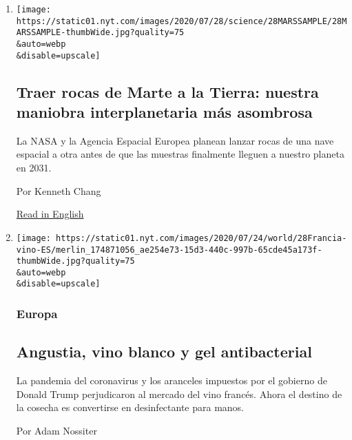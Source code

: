\begin{enumerate}
\def\labelenumi{\arabic{enumi}.}
\item
  \href{/es/2020/07/29/espanol/ciencia-y-tecnologia/mision-marte-nasa.html}{}

  \texttt{[image: https://static01.nyt.com/images/2020/07/28/science/28MARSSAMPLE/28MARSSAMPLE-thumbWide.jpg?quality=75\\\&auto=webp\\\&disable=upscale]}

  \hypertarget{traer-rocas-de-marte-a-la-tierra-nuestra-maniobra-interplanetaria-muxe1s-asombrosa}{%
  \subsection{Traer rocas de Marte a la Tierra: nuestra maniobra
  interplanetaria más
  asombrosa}\label{traer-rocas-de-marte-a-la-tierra-nuestra-maniobra-interplanetaria-muxe1s-asombrosa}}

  La NASA y la Agencia Espacial Europea planean lanzar rocas de una nave
  espacial a otra antes de que las muestras finalmente lleguen a nuestro
  planeta en 2031.

  Por Kenneth Chang

  \href{https://www.nytimes.com/2020/07/28/science/mars-sample-return-mission.html}{Read
  in English}
\item
  \href{/es/2020/07/28/espanol/mundo/vino-blanco-alsacia-coronavirus.html}{}

  \texttt{[image: https://static01.nyt.com/images/2020/07/24/world/28Francia-vino-ES/merlin\_174871056\_ae254e73-15d3-440c-997b-65cde45a173f-thumbWide.jpg?quality=75\\\&auto=webp\\\&disable=upscale]}

  \hypertarget{europa}{%
  \subsubsection{Europa}\label{europa}}

  \hypertarget{angustia-vino-blanco-y-gel-antibacterial}{%
  \subsection{Angustia, vino blanco y gel
  antibacterial}\label{angustia-vino-blanco-y-gel-antibacterial}}

  La pandemia del coronavirus y los aranceles impuestos por el gobierno
  de Donald Trump perjudicaron al mercado del vino francés. Ahora el
  destino de la cosecha es convertirse en desinfectante para manos.

  Por Adam Nossiter


\end{enumerate}
